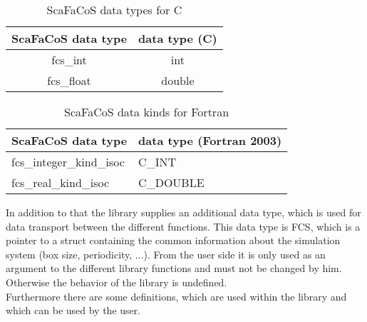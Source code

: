 \begin{table}[tbp]
\begin{center}
\begin{tabular}{|c|c|}
\hline
  ScaFaCoS data type            &    data type (C)     \\
\hline
  fcs\_int                      &    int        \\
\hline
  fcs\_float                    &    double        \\
\hline
\end{tabular}
\end{center}
\caption{ScaFaCoS data types for C}
\label{tab:c_data_types}
\end{table}

\begin{table}
\begin{center}
\begin{tabular}{|l|l|}
\hline
  ScaFaCoS data type              &    data type (Fortran 2003)     \\
\hline
\hline
  fcs\_integer\_kind\_isoc        &    C\_INT                \\
\hline
  fcs\_real\_kind\_isoc           &    C\_DOUBLE            \\
\hline
\end{tabular}
\end{center}
\caption{ScaFaCoS data kinds for Fortran}
\label{tab:fortran_data_kinds}
\end{table}

In addition to that the library supplies an additional data type, which is used for data 
transport between the different functions. This data type is FCS, which is a pointer to a struct
containing the common information about the simulation system (box size, periodicity, ...).
From the user side it is only used as an argument to the different library functions
and must not be changed by him. Otherwise the behavior of the library is undefined.\\
Furthermore there are some definitions, which are used within the library and which can 
be used by the user.

